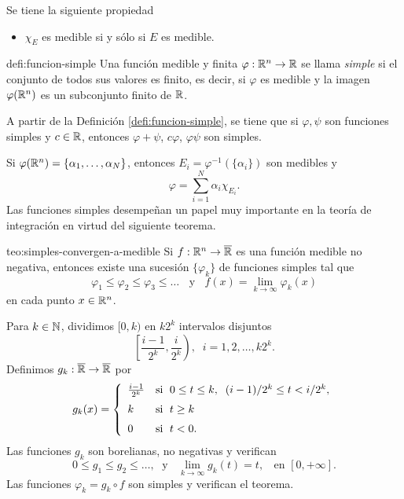 Se tiene la siguiente propiedad
\begin{itemize}
    \item $\chi_E$ es medible  si y s\'olo si $E$ es medible.
\end{itemize}


\begin{definicion}{defi:funcion-simple}
Una funci\'on medible y finita  $\varphi:\mathbb{R}^n \to \mathbb{R}$ 
se llama \emph{simple} si el conjunto de todos sus valores es finito, es decir, si $\varphi$ es medible y la imagen  $\varphi(\mathbb{R}^n)$ es un subconjunto finito de $\mathbb{R}$.
\end{definicion}

A partir de la Definici\'on \ref{defi:funcion-simple}, se tiene que si $\varphi,\psi$ son funciones simples y $c \in \mathbb{R}$, entonces $\varphi + \psi$, $c\varphi$,  $\varphi \psi$ son simples.

Si $\varphi(\mathbb{R}^n)=\{\alpha_1,\ldots,\alpha_N\}$, entonces $E_i=\varphi^{-1}(\{\alpha_i\})$ son medibles y 
\[
\varphi=\sum\limits_{i=1}^N \alpha_i \chi_{E_i}.
\]
Las funciones simples desempe\~nan un papel muy importante en la teor\'ia de integraci\'on en virtud del siguiente teorema.

\begin{teorema}{teo:simples-convergen-a-medible}
Si $f:\mathbb{R}^n \to \overline{\mathbb{R}}$ es una funci\'on medible no negativa, entonces existe una sucesi\'on $\{\varphi_k\}$ de funciones simples tal que
\[
\varphi_1\leq \varphi_2 \leq \varphi_3\leq \ldots \;\;\mbox{ y }\;\;
f(x)=\lim\limits_{k \to \infty} \varphi_k(x)
\]
en cada punto $x \in \mathbb{R}^n$.
\end{teorema}

\begin{demo}
Para $k \in \mathbb{N}$, dividimos $[0,k)$ en $k2^k$ intervalos disjuntos
\[
\left[\frac{i-1}{2^k},\frac{i}{2^k}\right), \;\;i=1,2,\ldots,k2^k.
\]
Definimos $g_k:\overline{\mathbb{R}} \to \overline{\mathbb{R}}$ por
\[
g_k(x)=
\left\{
\begin{array}{ll}
    \frac{i-1}{2^k} & \mbox{si }\; 0\leq t\leq k, \;\; (i-1)/2^k\leq t< i/2^k, 
    \medskip
    \\
    k     & \mbox{si }\;t\geq k
    \medskip
    \\
    0     & \mbox{si }\; t<0.
\end{array}
\right.
\]
Las funciones $g_k$ son borelianas, no negativas y verifican
\[
0\leq g_1\leq g_2\leq \ldots,\;\mbox{ y }\;\;
\lim\limits_{k \to \infty} g_k(t)=t, \;\;\mbox{ en } [0, +\infty].
\]
Las funciones $\varphi_k = g_k \circ f$ son simples y verifican  el teorema.
\end{demo}

